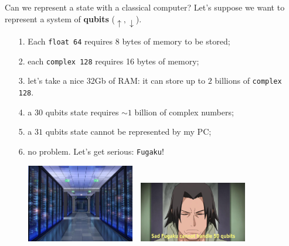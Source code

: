 \documentclass[aspectratio=169, 8pt, xcolor={svgnames}, hyperref={linkcolor=black}]{beamer}
\begin{document}
\begin{frame}{Can we represent a state with a classical computer?}
\pause
Let's suppose we want to represent a system of \textbf{qubits} ($\uparrow, \downarrow$).
\pause
\small
\begin{itemize}[noitemsep]
\item[1.] Each \texttt{float 64} requires 8 bytes of memory to be stored;
\pause
\item[2.] each \texttt{complex 128} requires 16 bytes of memory;
\pause
\item[3.] let's take a nice 32Gb of RAM: it can store up to $2$ billions of \texttt{complex 128}.
\pause
\item[4.] a $30$ qubits state requires $\sim 1$ billion of complex numbers;
\pause
\item[5.] a $31$ qubits state cannot be represented by my PC;
\pause
\item[6.] no problem. Let's get serious: \texttt{Fugaku}!
\end{itemize}

\begin{figure}
   \includegraphics[width=0.42\textwidth, height=0.4\textheight]{figures/fugaku.jpeg}%
   $\,\,$
   \pause
   \includegraphics[width=0.42\textwidth, height=0.4\textheight]{figures/sad_fugaku.jpg}
\end{figure}
\end{frame}
\end{document}
